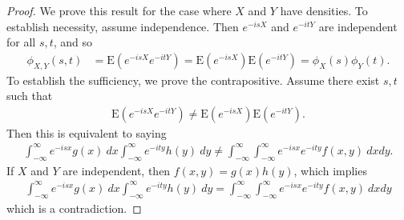 \begin{proof}
	We prove this result for the case where $X$ and $Y$ have densities.
	To establish necessity, assume independence. Then
	$e^{-isX}$ and $e^{-itY}$ are independent for all $s, t$, and so
	\begin{equation*}
		\begin{split}
			\phi_{X,Y}(s,t) & = \mathrm{E}(e^{-isX} e^{-itY}) = \mathrm{E}(e^{-isX}) \mathrm{E}(e^{-itY})
			= \phi_{X}(s) \phi_{Y}(t).
		\end{split}
	\end{equation*}
	To establish the sufficiency, we prove the contrapositive. Assume there exist $s, t$ such that
	\begin{equation*}
		\begin{split}
			\mathrm{E}(e^{-isX} e^{-itY}) \neq \mathrm{E}(e^{-isX}) \mathrm{E}(e^{-itY}).
		\end{split}
	\end{equation*}
	Then this is equivalent to saying
	\begin{equation*}
		\begin{split}
			\int_{-\infty}^{\infty} e^{-isx} g(x) \ dx \int_{-\infty}^{\infty}
			e^{-ity} h(y) \ dy
			\neq 
			\int_{-\infty}^{\infty}\int_{-\infty}^{\infty} e^{-isx} e^{-ity} f(x, y) \ dx
			dy.
		\end{split}
	\end{equation*}
	If $X$ and $Y$ are independent, then $f(x, y) = g(x) h(y)$, which implies
	\begin{equation*}
		\begin{split}
			\int_{-\infty}^{\infty} e^{-isx} g(x) \ dx \int_{-\infty}^{\infty}
			e^{-ity} h(y) \ dy
			= 
			\int_{-\infty}^{\infty}\int_{-\infty}^{\infty} e^{-isx} e^{-ity} f(x, y) \ dx dy
		\end{split}
	\end{equation*}
	which is a contradiction.
\end{proof}
